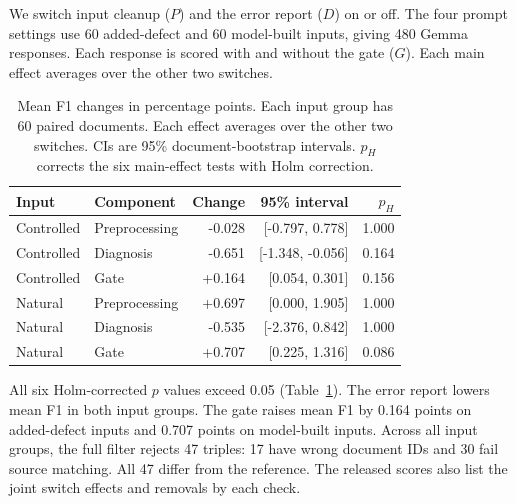We switch input cleanup ($P$) and the error report ($D$) on or off.
The four prompt settings use 60 added-defect and 60 model-built inputs,
giving 480 Gemma responses. Each response is scored with and without the
gate ($G$). Each main effect averages over the other two switches.

\begin{table}[t]

\centering

\caption{Mean F1 changes in percentage points. Each input group has 60 paired documents. Each effect averages over the other two switches. CIs are 95\% document-bootstrap intervals. $p_H$ corrects the six main-effect tests with Holm correction.}
\label{tab:recovery_factorial}

\small

\begin{tabular}{llrrr}

\toprule

Input & Component & Change & 95\% interval & $p_H$ \\

\midrule

Controlled & Preprocessing & -0.028 & [-0.797, 0.778] & 1.000 \\

Controlled & Diagnosis & -0.651 & [-1.348, -0.056] & 0.164 \\

Controlled & Gate & +0.164 & [0.054, 0.301] & 0.156 \\

Natural & Preprocessing & +0.697 & [0.000, 1.905] & 1.000 \\

Natural & Diagnosis & -0.535 & [-2.376, 0.842] & 1.000 \\

Natural & Gate & +0.707 & [0.225, 1.316] & 0.086 \\

\bottomrule

\end{tabular}

\end{table}

All six Holm-corrected $p$ values exceed 0.05
(Table~\ref{tab:recovery_factorial}). The error report lowers mean F1
in both input groups. The gate raises mean F1 by 0.164 points on
added-defect inputs and 0.707 points on model-built inputs.
Across all input groups, the full filter rejects 47 triples:
17 have wrong document IDs and 30 fail source matching.
All 47 differ from the reference. The released scores also list the joint
switch effects and removals by each check.

